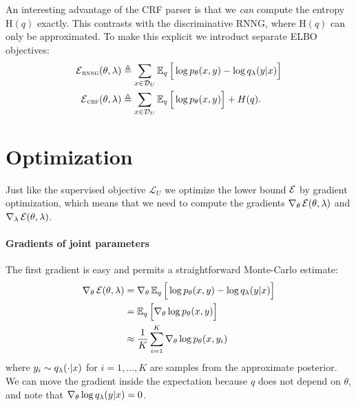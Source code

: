 An interesting advantage of the CRF parser is that we \textit{can} compute the entropy H$(q)$ exactly. This contrasts with the discriminative RNNG, where H$(q)$ can only be approximated. To make this explicit we introduct separate ELBO objectives:
\begin{align}
  \operatorname{\mathcal{E}}_{\textsc{rnng}}(\theta, \lambda) &\triangleq \sum_{x \in \mathcal{D}_U}\operatorname{\mathbb{E}}_{q} \Big[\log p_{\theta}(x,y )  - \log  q_{\lambda}(y | x) \Big] \\
  \operatorname{\mathcal{E}}_{\textsc{crf}}(\theta, \lambda) &\triangleq \sum_{x \in \mathcal{D}_U} \operatorname{\mathbb{E}}_{q} \Big[\log p_{\theta}(x,y ) \Big]  + H(q).
\end{align}


\section{Optimization}
Just like the supervised objective $\mathcal{L}_U$ we optimize the lower bound $\operatorname{\mathcal{E}}$ by gradient optimization, which means that we need to compute the gradients $\nabla_{\theta} \operatorname{\mathcal{E}}(\theta, \lambda)$ and $\nabla_{\lambda} \operatorname{\mathcal{E}}(\theta, \lambda)$.

\paragraph{Gradients of joint parameters} The first gradient is easy and permits a straightforward Monte-Carlo estimate:
\begin{align*}
  \nabla_{\theta} \operatorname{\mathcal{E}}(\theta, \lambda)
    &= \nabla_{\theta} \operatorname{\mathbb{E}}_{q} \Big[\log p_{\theta}(x, y)  - \log q_{\lambda}(y | x) \Big] \\
    &= \operatorname{\mathbb{E}}_{q} \Big[ \nabla_{\theta} \log p_{\theta}(x, y) \Big] \\
    &\approx \frac{1}{K}\sum_{i=1}^K  \nabla_{\theta} \log p_{\theta}(x, y_{i})
\end{align*}
where $y_i \sim q_{\lambda}( \cdot | x)$ for $i=1,\dots,K$ are samples from the approximate posterior. We can move the gradient inside the expectation because $q$ does not depend on $\theta$, and note that $\nabla_{\theta} \log q_{\lambda}(y | x) = 0$.

